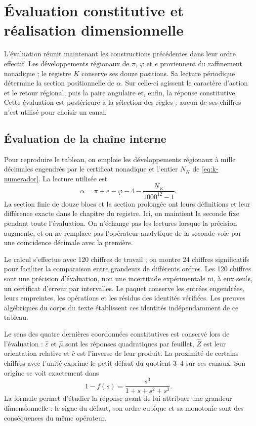 \section{Évaluation constitutive et réalisation dimensionnelle}
\label{iii:sec:evaluacion}

L’évaluation réunit maintenant les constructions précédentes dans leur ordre effectif.
Les développements régionaux de $\pi$, $\varphi$ et $e$ proviennent du raffinement
nonadique ; le registre $K$ conserve ses douze positions. Sa lecture périodique
détermine la section positionnelle de $\alpha$. Sur celle-ci agissent le caractère
d’action et le retour régional, puis la paire angulaire et, enfin, la
réponse constitutive. Cette évaluation est postérieure à la sélection des
règles : aucun de ses chiffres n’est utilisé pour choisir un canal.

\subsection{Évaluation de la chaîne interne}

Pour reproduire le tableau, on emploie les développements régionaux à mille
décimales engendrés par le certificat nonadique et l’entier $N_K$ de
\eqref{eq:k-numerador}. La lecture utilisée est
\[
 \alpha=\pi+e-\varphi-4-\frac{N_K}{1000^{12}-1}.
\]
La section finie de douze blocs et la section prolongée ont leurs
définitions et leur différence exacte dans le chapitre du registre. Ici, on
maintient la seconde fixe pendant toute l’évaluation. On n’échange pas
les lectures lorsque la précision augmente, et on ne remplace pas l’opérateur analytique
de la seconde voie par une coïncidence décimale avec la première.



Le calcul s’effectue avec 120 chiffres de travail ; on montre 24 chiffres
significatifs pour faciliter la comparaison entre grandeurs de différents
ordres. Les 120 chiffres sont une précision d’évaluation, non une incertitude
expérimentale ni, à eux seuls, un certificat d’erreur par intervalles.
Le paquet conserve les entrées engendrées, leurs empreintes, les opérations et
les résidus des identités vérifiées. Les preuves algébriques du
corps du texte établissent ces identités indépendamment de ce tableau.

Le sens des quatre dernières coordonnées constitutives est conservé
lors de l’évaluation : $\widehat\varepsilon$ et $\widehat\mu$ sont les réponses
quadratiques par feuillet, $\widehat Z$ est leur orientation relative et
$\widehat c$ est l’inverse de leur produit. La proximité de certains chiffres avec
l’unité exprime le petit défaut du quotient $3$--$4$ sur ces
canaux. Son origine se voit exactement dans
\[
 1-f(s)=\frac{s^3}{1+s+s^2+s^3}.
\]
La formule permet d’étudier la réponse avant de lui attribuer une grandeur
dimensionnelle : le signe du défaut, son ordre cubique et sa monotonie sont
des conséquences du même opérateur.

